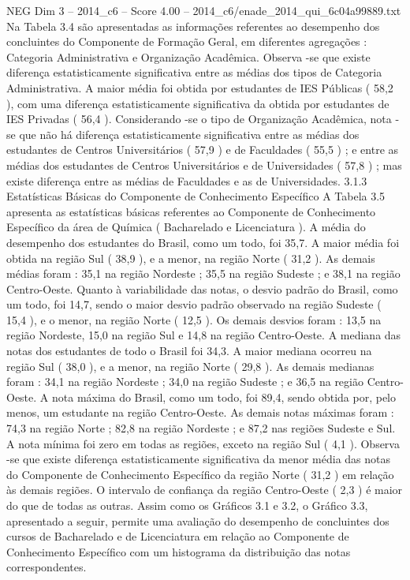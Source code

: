 \begin{textsample}{NEG Dim 3 – 2014\_c6 – Score 4.00 – 2014\_c6/enade\_2014\_qui\_6c04a99889.txt}
Na Tabela 3.4 são apresentadas as informações referentes ao desempenho dos concluintes do Componente de Formação Geral, em diferentes agregações : Categoria Administrativa e Organização Acadêmica.
Observa -se que existe diferença estatisticamente significativa entre as médias dos tipos de Categoria Administrativa.
A maior média foi obtida por estudantes de IES Públicas ( 58,2 ), com uma diferença estatisticamente significativa da obtida por estudantes de IES Privadas ( 56,4 ).
Considerando -se o tipo de Organização Acadêmica, nota -se que não há diferença estatisticamente significativa entre as médias dos estudantes de Centros Universitários ( 57,9 ) e de Faculdades ( 55,5 ) ; e entre as médias dos estudantes de Centros Universitários e de Universidades ( 57,8 ) ; mas existe diferença entre as médias de Faculdades e as de Universidades. 3.1.3 Estatísticas Básicas do Componente de Conhecimento Específico A Tabela 3.5 apresenta as estatísticas básicas referentes ao Componente de Conhecimento Específico da área de Química ( Bacharelado e Licenciatura ).
A média do desempenho dos estudantes do Brasil, como um todo, foi 35,7.
A maior média foi obtida na região Sul ( 38,9 ), e a menor, na região Norte ( 31,2 ).
As demais médias foram : 35,1 na região Nordeste ; 35,5 na região Sudeste ; e 38,1 na região Centro-Oeste.
Quanto à variabilidade das notas, o desvio padrão do Brasil, como um todo, foi 14,7, sendo o maior desvio padrão observado na região Sudeste ( 15,4 ), e o menor, na região Norte ( 12,5 ).
Os demais desvios foram : 13,5 na região Nordeste, 15,0 na região Sul e 14,8 na região Centro-Oeste.
A mediana das notas dos estudantes de todo o Brasil foi 34,3.
A maior mediana ocorreu na região Sul ( 38,0 ), e a menor, na região Norte ( 29,8 ).
As demais medianas foram : 34,1 na região Nordeste ; 34,0 na região Sudeste ; e 36,5 na região Centro-Oeste.
A nota máxima do Brasil, como um todo, foi 89,4, sendo obtida por, pelo menos, um estudante na região Centro-Oeste.
As demais notas máximas foram : 74,3 na região Norte ; 82,8 na região Nordeste ; e 87,2 nas regiões Sudeste e Sul.
A nota mínima foi zero em todas as regiões, exceto na região Sul ( 4,1 ).
Observa -se que existe diferença estatisticamente significativa da menor média das notas do Componente de Conhecimento Específico da região Norte ( 31,2 ) em relação às demais regiões.
O intervalo de confiança da região Centro-Oeste ( 2,3 ) é maior do que de todas as outras.
Assim como os Gráficos 3.1 e 3.2, o Gráfico 3.3, apresentado a seguir, permite uma avaliação do desempenho de concluintes dos cursos de Bacharelado e de Licenciatura em relação ao Componente de Conhecimento Específico com um histograma da distribuição das notas correspondentes.

\end{textsample}
